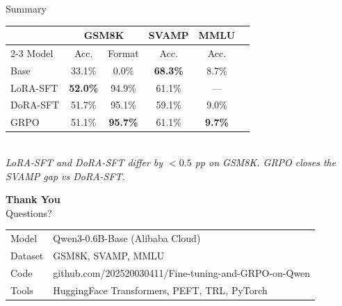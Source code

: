 \documentclass[aspectratio=169,10pt]{beamer}
\begin{document}
\begin{frame}{Summary}
    \begin{center}
    \begin{tabular}{lccccc}
      \toprule
      & \multicolumn{2}{c}{GSM8K} & SVAMP & MMLU \\
      \cmidrule(lr){2-3}
      Model & Acc. & Format & Acc. & Acc. \\
      \midrule
      Base       & 33.1\% & 0.0\%           & \textbf{68.3\%} & 8.7\%  \\
      LoRA-SFT   & \textbf{52.0\%} & 94.9\% & 61.1\%         & —      \\
      DoRA-SFT   & 51.7\% & 95.1\%          & 59.1\%          & 9.0\%  \\
      GRPO       & 51.1\% & \textbf{95.7\%} & 61.1\%          & \textbf{9.7\%} \\
      \bottomrule
    \end{tabular}
    \vspace{0.4em}\\
    \small\textit{LoRA-SFT and DoRA-SFT differ by $<0.5$ pp on GSM8K.
    GRPO closes the SVAMP gap vs DoRA-SFT.}
  \end{center}
\end{frame}
\begin{frame}[plain]
  \begin{center}
    \vspace{2em}
    {\Huge \textbf{Thank You}}\\[1em]
    {\large Questions?}\\[2em]
    \small
    \begin{tabular}{ll}
      Model   & Qwen3-0.6B-Base (Alibaba Cloud) \\
      Dataset & GSM8K, SVAMP, MMLU \\
      Code    & github.com/202520030411/Fine-tuning-and-GRPO-on-Qwen \\
      Tools   & HuggingFace Transformers, PEFT, TRL, PyTorch \\
    \end{tabular}
  \end{center}
\end{frame}
\end{document}
